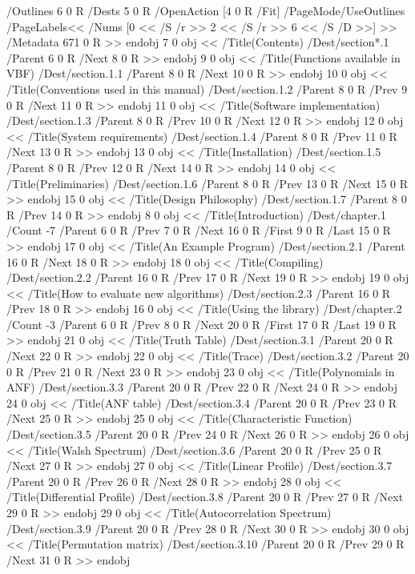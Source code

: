 {{{{{{{{{{{{{{{{{{{{{{{{{{{{/Outlines 6 0 R
/Dests 5 0 R
/OpenAction [4 0 R /Fit]
/PageMode/UseOutlines
/PageLabels<<
/Nums [0 <<
/S /r
>> 2 <<
/S /r
>> 6 <<
/S /D
>>]
>>
/Metadata 671 0 R
>>
endobj
7 0 obj
<< /Title(Contents)
/Dest/section*.1
/Parent 6 0 R
/Next 8 0 R
>>
endobj
9 0 obj
<< /Title(Functions available in VBF)
/Dest/section.1.1
/Parent 8 0 R
/Next 10 0 R
>>
endobj
10 0 obj
<< /Title(Conventions used in this manual)
/Dest/section.1.2
/Parent 8 0 R
/Prev 9 0 R
/Next 11 0 R
>>
endobj
11 0 obj
<< /Title(Software implementation)
/Dest/section.1.3
/Parent 8 0 R
/Prev 10 0 R
/Next 12 0 R
>>
endobj
12 0 obj
<< /Title(System requirements)
/Dest/section.1.4
/Parent 8 0 R
/Prev 11 0 R
/Next 13 0 R
>>
endobj
13 0 obj
<< /Title(Installation)
/Dest/section.1.5
/Parent 8 0 R
/Prev 12 0 R
/Next 14 0 R
>>
endobj
14 0 obj
<< /Title(Preliminaries)
/Dest/section.1.6
/Parent 8 0 R
/Prev 13 0 R
/Next 15 0 R
>>
endobj
15 0 obj
<< /Title(Design Philosophy)
/Dest/section.1.7
/Parent 8 0 R
/Prev 14 0 R
>>
endobj
8 0 obj
<< /Title(Introduction)
/Dest/chapter.1
/Count -7 /Parent 6 0 R
/Prev 7 0 R
/Next 16 0 R
/First 9 0 R /Last 15 0 R
>>
endobj
17 0 obj
<< /Title(An Example Program)
/Dest/section.2.1
/Parent 16 0 R
/Next 18 0 R
>>
endobj
18 0 obj
<< /Title(Compiling)
/Dest/section.2.2
/Parent 16 0 R
/Prev 17 0 R
/Next 19 0 R
>>
endobj
19 0 obj
<< /Title(How to evaluate new algorithms)
/Dest/section.2.3
/Parent 16 0 R
/Prev 18 0 R
>>
endobj
16 0 obj
<< /Title(Using the library)
/Dest/chapter.2
/Count -3 /Parent 6 0 R
/Prev 8 0 R
/Next 20 0 R
/First 17 0 R /Last 19 0 R
>>
endobj
21 0 obj
<< /Title(Truth Table)
/Dest/section.3.1
/Parent 20 0 R
/Next 22 0 R
>>
endobj
22 0 obj
<< /Title(Trace)
/Dest/section.3.2
/Parent 20 0 R
/Prev 21 0 R
/Next 23 0 R
>>
endobj
23 0 obj
<< /Title(Polynomials in ANF)
/Dest/section.3.3
/Parent 20 0 R
/Prev 22 0 R
/Next 24 0 R
>>
endobj
24 0 obj
<< /Title(ANF table)
/Dest/section.3.4
/Parent 20 0 R
/Prev 23 0 R
/Next 25 0 R
>>
endobj
25 0 obj
<< /Title(Characteristic Function)
/Dest/section.3.5
/Parent 20 0 R
/Prev 24 0 R
/Next 26 0 R
>>
endobj
26 0 obj
<< /Title(Walsh Spectrum)
/Dest/section.3.6
/Parent 20 0 R
/Prev 25 0 R
/Next 27 0 R
>>
endobj
27 0 obj
<< /Title(Linear Profile)
/Dest/section.3.7
/Parent 20 0 R
/Prev 26 0 R
/Next 28 0 R
>>
endobj
28 0 obj
<< /Title(Differential Profile)
/Dest/section.3.8
/Parent 20 0 R
/Prev 27 0 R
/Next 29 0 R
>>
endobj
29 0 obj
<< /Title(Autocorrelation Spectrum)
/Dest/section.3.9
/Parent 20 0 R
/Prev 28 0 R
/Next 30 0 R
>>
endobj
30 0 obj
<< /Title(Permutation matrix)
/Dest/section.3.10
/Parent 20 0 R
/Prev 29 0 R
/Next 31 0 R
>>
endobj
}}}}}}}}}}}}}}}}}}}}}}}}}}}}
